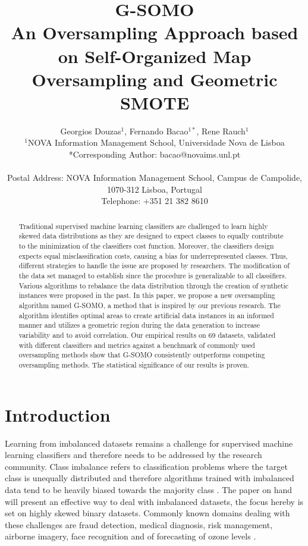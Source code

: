 \documentclass[parskip=full]{scrartcl}
\title{G-SOMO \\ \LARGE{An Oversampling Approach based on Self-Organized Map Oversampling and Geometric SMOTE}}
\author{
	Georgios Douzas\(^{1}\), Fernando Bacao\(^{1*}\), Rene Rauch\(^{1}\)
	\\
	\small{\(^{1}\)NOVA Information Management School, Universidade Nova de Lisboa}
	\\
	\small{*Corresponding Author: bacao@novaims.unl.pt}
	\\
	\\
	\small{Postal Address: NOVA Information Management School, Campus de Campolide, 1070-312 Lisboa, Portugal}
	\\
	\small{Telephone: +351 21 382 8610}
}
\date{}
\begin{document}
\maketitle

\begin{abstract}
Traditional supervised machine learning classifiers are challenged to learn
highly skewed data distributions as they are designed to expect classes to
equally contribute to the minimization of the classifiers cost function.
Moreover, the classifiers design expects equal misclassification costs, causing
a bias for underrepresented classes. Thus, different strategies to handle the
issue are proposed by researchers. The modification of the data set managed to
establish since the procedure is generalizable to all classifiers. Various
algorithms to rebalance the data distribution through the creation of synthetic
instances were proposed in the past.  In this paper, we propose a new
oversampling algorithm named G-SOMO, a method that is inspired by our previous
research. The algorithm identifies optimal areas to create artificial data
instances in an informed manner and utilizes a geometric region during the data
generation to increase variability and to avoid correlation. Our empirical
results on 69 datasets, validated with different classifiers and metrics against
a benchmark of commonly used oversampling methods show that G-SOMO consistently
outperforms competing oversampling methods. The statistical significance of our
results is proven. 
\end{abstract}

\section{Introduction}

Learning from imbalanced datasets remains a challenge for supervised machine
learning classifiers and therefore needs to be addressed by the research
community. Class imbalance refers to classification problems where the target
class is unequally distributed and therefore algorithms trained with imbalanced
data tend to be heavily biased towards the majority class \cite{Hoens2013}. The
paper on hand will present an effective way to deal with imbalanced datasets,
the focus hereby is set on highly skewed binary datasets. Commonly known domains
dealing with these challenges are fraud detection, medical diagnosis, risk
management, airborne imagery, face recognition and of forecasting of ozone
levels \cite{Akbani2004}.
\end{document}
